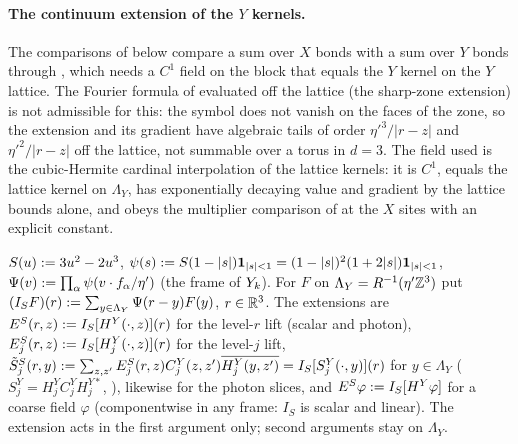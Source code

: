 
\paragraph{The continuum extension of the $Y$ kernels.}
The comparisons of  below compare a sum over $X$ bonds with a sum over $Y$ bonds through , which needs a $C^1$ field on the block that equals the $Y$ kernel on the $Y$ lattice. The Fourier formula of  evaluated off the lattice (the sharp-zone extension) is not admissible for this: the symbol does not vanish on the faces of the zone, so the extension and its gradient have algebraic tails of order $\eta'^3/|r-z|$ and $\eta'^2/|r-z|$ off the lattice, not summable over a torus in $d=3$. The field used is the cubic-Hermite cardinal interpolation of the lattice kernels: it is $C^1$, equals the lattice kernel on $\Lambda_Y$, has exponentially decaying value and gradient by the lattice bounds alone, and obeys the multiplier comparison of  at the $X$ sites with an explicit constant.

\begin{definition}\label{rot:hyb:def:ES}
$S(u):=3u^2-2u^3$, $\psi(s):= S(1-|s|)\mathbf 1_{|s|<1}=(1-|s|)^2(1+2|s|)\mathbf 1_{|s|<1}$, $\Psi(v):=\prod_\alpha\psi(v\cdot f_\alpha/\eta')$ (the frame of $Y_k$). For $F$ on $\Lambda_Y=R^{-1}(\eta'\mathbb Z^3)$ put $(I_SF)(r):=\sum_{y\in\Lambda_Y}\Psi(r-y)F(y)$, $r\in\mathbb R^3$. The extensions are $E^S(r,z):= I_S[H^Y(\cdot,z)](r)$ for the level-$r$ lift (scalar and photon), $E^S_j(r,z):= I_S[H^Y_j(\cdot,z)](r)$ for the level-$j$ lift, $\tilde S^S_j(r,y):=\sum_{z,z'}E^S_j(r,z)C^Y_j(z,z')\overline{H^Y_j(y,z')}=I_S[S^Y_j(\cdot,y)](r)$ for $y\in\Lambda_Y$ ($S^Y_j=H^Y_jC^Y_jH^{Y*}_j$, ), likewise for the photon slices, and $E^S\varphi:= I_S[H^Y\varphi]$ for a coarse field $\varphi$ (componentwise in any frame: $I_S$ is scalar and linear). The extension acts in the first argument only; second arguments stay on $\Lambda_Y$.
\end{definition}

